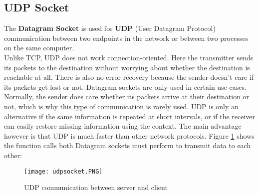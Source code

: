 \subsection{UDP Socket}
The \textbf{Datagram Socket} is used for \textbf{UDP} (User Datagram Protocol) communication between two endpoints in the network or between two processes on the same computer.
\\Unlike TCP, UDP does not work connection-oriented. Here the transmitter sends its packets to the destination without worrying about whether the destination is reachable at all. There is also no error recovery because the sender doesn't care if its packets get lost or not. Datagram sockets are only used in certain use cases. Normally, the sender does care whether its packets arrive at their destination or not, which is why this type of communication is rarely used. UDP is only an alternative if the same information is repeated at short intervals, or if the receiver can easily restore missing information using the context. The main advantage however is that UDP is much faster than other network protocols. Figure \ref{udpsocket} shows the function calls both Datagram sockets must perform to transmit data to each other:\\
\begin{figure}[H]
	\centering
	\texttt{[image: udpsocket.PNG]}
	\caption[Caption for LOF]{UDP communication between server and client\footnotemark}
	\label{udpsocket}
\end{figure}
